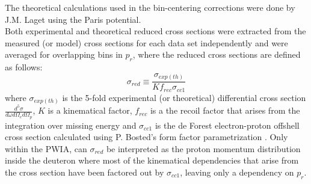 The theoretical calculations used in the bin-centering corrections were done by J.M. Laget using the Paris potential\cite{PhysRevC.21.861}. \\
\indent Both experimental and theoretical reduced cross sections were extracted from the measured (or model) cross sections for each data set independently and were averaged for overlapping bins in $p_{r}$,
where the reduced cross sections are defined as follows:
\begin{equation}
\sigma_{red} \equiv \frac{\sigma_{exp(th)}}{Kf_{rec}\sigma_{cc1}}
\label{eq:1}
\end{equation}
where $\sigma_{exp(th)}$ is the 5-fold experimental (or theoretical) differential cross section $\frac{d^{5}\sigma}{d\omega d\Omega_{e} d\Omega_{p}}$, $K$ is a kinematical factor, $f_{rec}$ is a the recoil factor that arises from the
integration over missing energy and $\sigma_{cc1}$ is the de Forest\cite{DEFOREST1983} electron-proton offshell cross section calculated using P. Bosted's form factor parametrization \cite{PhysRevC.51.409}.
Only within the PWIA, can $\sigma_{red}$ be interpreted as the proton momentum distribution inside the deuteron where most of the kinematical dependencies that arise from the
cross section have been factored out by $\sigma_{cc1}$, leaving only a dependency on $p_{r}$. \\
